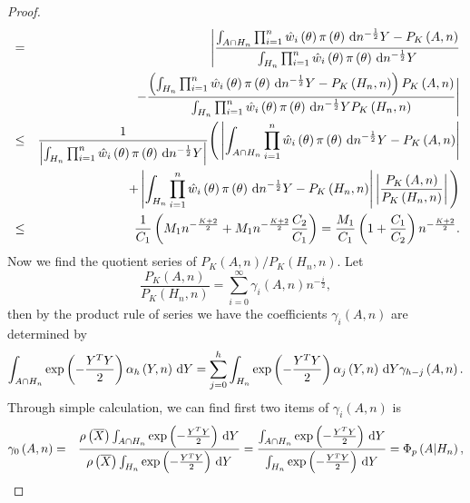 \begin{thm}
\begin{proof}
\begin{eqnarray}
 & = & \Bigg|\frac{\int_{A\cap H_{n}}\prod_{i=1}^{n}\hat{w}_{i}\left(\theta\right)\pi\left(\theta\right)\,\mathrm{d} n^{-\frac{1}{2}}Y-P_{K}\left(A,n\right)}{\int_{H_{n}}\prod_{i=1}^{n}\hat{w}_{i}\left(\theta\right)\pi\left(\theta\right)\,\mathrm{d} n^{-\frac{1}{2}}Y}\nonumber \\
 &  & -\frac{\left(\int_{H_{n}}\prod_{i=1}^{n}\hat{w}_{i}\left(\theta\right)\pi\left(\theta\right)\,\mathrm{d} n^{-\frac{1}{2}}Y-P_{K}\left(H_{n},n\right)\right)P_{K}\left(A,n\right)}{\int_{H_{n}}\prod_{i=1}^{n}\hat{w}_{i}\left(\theta\right)\pi\left(\theta\right)\,\mathrm{d} n^{-\frac{1}{2}}YP_{K}\left(H_{n},n\right)}\Bigg|\nonumber \\
 & \le & \frac{1}{\left|\int_{H_{n}}\prod_{i=1}^{n}\hat{w}_{i}\left(\theta\right)\pi\left(\theta\right)\,\mathrm{d} n^{-\frac{1}{2}}Y\right|}\Bigg(\left|\int_{A\cap H_{n}}\prod_{i=1}^{n}\hat{w}_{i}\left(\theta\right)\pi\left(\theta\right)\,\mathrm{d} n^{-\frac{1}{2}}Y-P_{K}\left(A,n\right)\right|\nonumber \\
 &  & +\left|\int_{H_{n}}\prod_{i=1}^{n}\hat{w}_{i}\left(\theta\right)\pi\left(\theta\right)\,\mathrm{d} n^{-\frac{1}{2}}Y-P_{K}\left(H_{n},n\right)\right|\left|\frac{P_{K}\left(A,n\right)}{P_{K}\left(H_{n},n\right)}\right|\Bigg)\nonumber \\
 & \le & \frac{1}{C_{1}}\left(M_{1}n^{-\frac{K+2}{2}}+M_{1}n^{-\frac{K+2}{2}}\frac{C_{2}}{C_{1}}\right)=\frac{M_{1}}{C_{1}}\left(1+\frac{C_{1}}{C_{2}}\right)n^{-\frac{K+2}{2}}.\label{eq:two-quotient-close}
\end{eqnarray}
Now we find the quotient series of $P_{K}\left(A,n\right)/P_{K}\left(H_{n},n\right)$.
Let 
\[
\frac{P_{K}\left(A,n\right)}{P_{K}\left(H_{n},n\right)}=\sum_{i=0}^{\infty}\gamma_{i}\left(A,n\right)n^{-\frac{i}{2}},
\]
then by the product rule of series we have the coefficients $\gamma_{i}\left(A,n\right)$
are determined by 
\[
\int_{A\cap H_{n}}\exp\left(-\frac{Y^{T}Y}{2}\right)\alpha_{h}\left(Y,n\right)\,\mathrm{d} Y=\sum_{j=0}^{h}\int_{H_{n}}\exp\left(-\frac{Y^{T}Y}{2}\right)\alpha_{j}\left(Y,n\right)\,\mathrm{d} Y\gamma_{h-j}\left(A,n\right).
\]
Through simple calculation, we can find first two items of $\gamma_{i}\left(A,n\right)$
is 
\begin{eqnarray*}
\gamma_{0}\left(A,n\right) & = & \frac{\rho\left(\overline{X}\right)\int_{A\cap H_{n}}\exp\left(-\frac{Y^{T}Y}{2}\right)\diff Y}{\rho\left(\overline{X}\right)\int_{H_{n}}\exp\left(-\frac{Y^{T}Y}{2}\right)\diff Y}=\frac{\int_{A\cap H_{n}}\exp\left(-\frac{Y^{T}Y}{2}\right)\diff Y}{\int_{H_{n}}\exp\left(-\frac{Y^{T}Y}{2}\right)\diff Y}=\Phi_{p}\left(A|H_{n}\right),\\

\end{eqnarray*}
\end{proof}
\end{thm}
